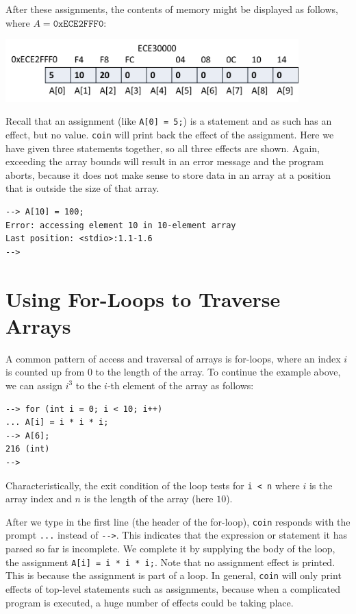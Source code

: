 After these assignments, the contents of memory might be displayed as
follows, where $A = \mathtt{0xECE2FFF0}$:
\begin{center}
\includegraphics[width=0.85\textwidth]{img/array1.png}
\end{center}

Recall that an assignment (like \lstinline'A[0] = 5;') is a statement
and as such has an effect, but no value.  \lstinline'coin' will print
back the effect of the assignment.  Here we have given three
statements together, so all three effects are shown.  Again, exceeding
the array bounds will result in an error message and the program
aborts, because it does not make sense to store data in an array at a
position that is outside the size of that array.

\begin{lstlisting}[language={[coin]C}]
--> A[10] = 100;
Error: accessing element 10 in 10-element array
Last position: <stdio>:1.1-1.6
-->
\end{lstlisting}


\section{Using For-Loops to Traverse Arrays}
\label{sec:arrays:fors}

A common pattern of access and traversal of arrays is for-loops, where
an index $i$ is counted up from 0 to the length of the array.  To
continue the example above, we can assign $i^3$ to the $i$-th element
of the array as follows:

\begin{lstlisting}[language={[coin]C}]
--> for (int i = 0; i < 10; i++)
... A[i] = i * i * i;
--> A[6];
216 (int)
-->
\end{lstlisting}

Characteristically, the exit condition of the loop tests for
\lstinline'i < n' where $i$ is the array index and $n$ is the length
of the array (here $10$).

After we type in the first line (the header of the for-loop),
\lstinline'coin' responds with the prompt
\lstinline[language={[coin]C}]'...' instead of
\lstinline[language={[coin]C}]'-->'.  This indicates that the
expression or statement it has parsed so far is incomplete.  We
complete it by supplying the body of the loop, the assignment
\lstinline'A[i] = i * i * i;'.  Note that no assignment effect is
printed.  This is because the assignment is part of a loop.  In
general, \lstinline'coin' will only print effects of top-level
statements such as assignments, because when a complicated program is
executed, a huge number of effects could be taking place.



